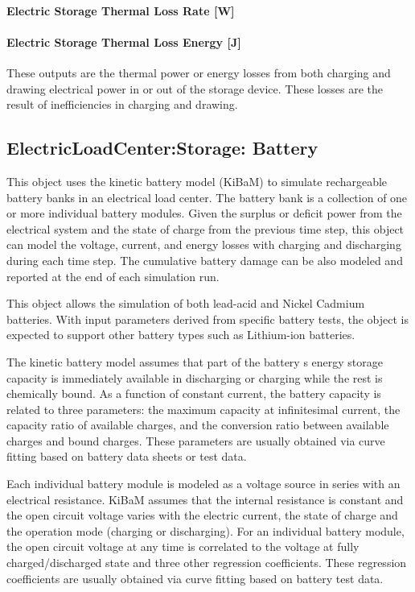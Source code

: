 \paragraph{Electric Storage Thermal Loss Rate {[}W{]}}\label{electric-storage-thermal-loss-rate-w}

\paragraph{Electric Storage Thermal Loss Energy {[}J{]}}\label{electric-storage-thermal-loss-energy-j}

These outputs are the thermal power or energy losses from both charging and drawing electrical power in or out of the storage device. These losses are the result of inefficiencies in charging and drawing.

\subsection{ElectricLoadCenter:Storage: Battery}\label{electricloadcenterstorage-battery}

This object uses the kinetic battery model (KiBaM) to simulate rechargeable battery banks in an electrical load center. The battery bank is a collection of one or more individual battery modules. Given the surplus or deficit power from the electrical system and the state of charge from the previous time step, this object can model the voltage, current, and energy losses with charging and discharging during each time step. The cumulative battery damage can be also modeled and reported at the end of each simulation run.

This object allows the simulation of both lead-acid and Nickel Cadmium batteries. With input parameters derived from specific battery tests, the object is expected to support other battery types such as Lithium-ion batteries.

The kinetic battery model assumes that part of the battery s energy storage capacity is immediately available in discharging or charging while the rest is chemically bound. As a function of constant current, the battery capacity is related to three parameters: the maximum capacity at infinitesimal current, the capacity ratio of available charges, and the conversion ratio between available charges and bound charges. These parameters are usually obtained via curve fitting based on battery data sheets or test data.

Each individual battery module is modeled as a voltage source in series with an electrical resistance. KiBaM assumes that the internal resistance is constant and the open circuit voltage varies with the electric current, the state of charge and the operation mode (charging or discharging). For an individual battery module, the open circuit voltage at any time is correlated to the voltage at fully charged/discharged state and three other regression coefficients. These regression coefficients are usually obtained via curve fitting based on battery test data.

